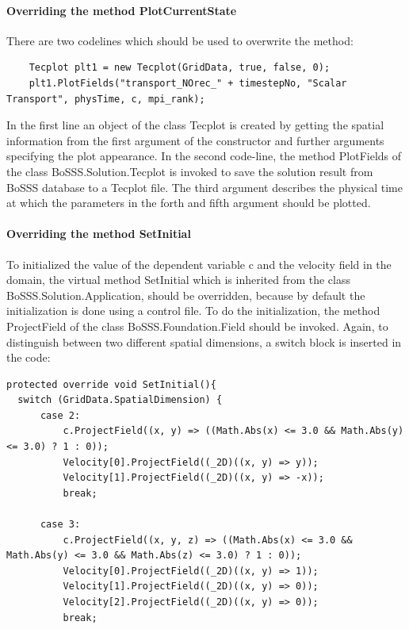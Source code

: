 \documentclass[11pt,twoside,a4paper]{fdyartcl}
\begin{document}
{\paragraph{Overriding the method {\scriptsize PlotCurrentState}}
There are two codelines which should be used to overwrite the method:
{\scriptsize \begin{verbatim}
	Tecplot plt1 = new Tecplot(GridData, true, false, 0);
	plt1.PlotFields("transport_NOrec_" + timestepNo, "Scalar Transport", physTime, c, mpi_rank);
\end{verbatim}}
In the first line an object of the class Tecplot is created by getting the spatial information from the first argument of the constructor and further arguments specifying the plot appearance. In the second code-line, the method {\scriptsize PlotFields} of the class {\scriptsize BoSSS.Solution.Tecplot} is invoked to save the solution result from BoSSS database to a Tecplot file. The third argument describes the physical time at which the parameters in the forth and fifth argument should be plotted.
\paragraph{Overriding the method {\scriptsize SetInitial}}
To initialized the value of the dependent variable {\scriptsize c} and the velocity field in the domain, the virtual method {\scriptsize SetInitial} which is inherited from the class {\scriptsize BoSSS.Solution.Application}, should be overridden, because by default the initialization is done using a control file. To do the initialization, the method {\scriptsize ProjectField} of the class {\scriptsize BoSSS.Foundation.Field} should be invoked. Again, to distinguish between two different spatial dimensions, a switch block is inserted in the code:
{\scriptsize \begin{verbatim}
protected override void SetInitial(){	
  switch (GridData.SpatialDimension) {
	  case 2:
		  c.ProjectField((x, y) => ((Math.Abs(x) <= 3.0 && Math.Abs(y) <= 3.0) ? 1 : 0));
		  Velocity[0].ProjectField((_2D)((x, y) => y));
		  Velocity[1].ProjectField((_2D)((x, y) => -x));
		  break;
  
	  case 3:
		  c.ProjectField((x, y, z) => ((Math.Abs(x) <= 3.0 && Math.Abs(y) <= 3.0 && Math.Abs(z) <= 3.0) ? 1 : 0));
		  Velocity[0].ProjectField((_2D)((x, y) => 1));
		  Velocity[1].ProjectField((_2D)((x, y) => 0));
		  Velocity[2].ProjectField((_2D)((x, y) => 0));
		  break;
  

\end{verbatim}}}
\end{document}
